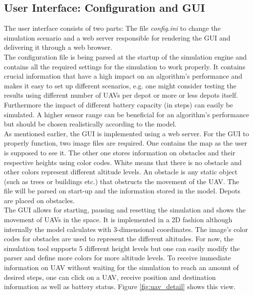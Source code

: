 \subsection{User Interface: Configuration and GUI}
The user interface consists of two parts: The file \textit{config.ini} to change the simulation scenario and a web server responsible for rendering the GUI and delivering it through a web browser.\\
The configuration file is being parsed at the startup of the simulation engine and contains all the required settings for the simulation to work properly. It contains crucial information that have a high impact on an algorithm's performance and makes it easy to set up different scenarios, e.g. one might consider testing the results using different number of UAVs per depot or more or less depots itself.
Furthermore the impact of different battery capacity (in steps) can easily be simulated. A higher sensor range can be beneficial for an algorithm's performance but should be chosen realistically according to the model.\\
As mentioned earlier, the GUI is implemented using a web server. For the GUI to properly function, two image files are required. One contains the map as the user is supposed to see it. The other one stores information on obstacles and their respective heights using color codes. White means that there is no obstacle and other colors represent different altitude levels. An obstacle is any static object (such as trees or buildings etc.) that obstructs the movement of the UAV. The file will be parsed on start-up and the information stored in the model.  Depots are placed on obstacles.\\
The GUI allows for starting, pausing and resetting the simulation and shows the movement of UAVs in the space. It is implemented in a 2D fashion although internally the model calculates with 3-dimensional coordinates. The image's color codes for obstacles are used to represent the different altitudes. For now, the simulation tool supports 5 different height levels but one can easily modify the parser and define more colors for more altitude levels.
To receive immediate information on UAV without waiting for the simulation to reach an amount of desired steps, one can click on a UAV, receive position and destination information as well as battery status. Figure \ref{fig:uav_detail} shows this view.



